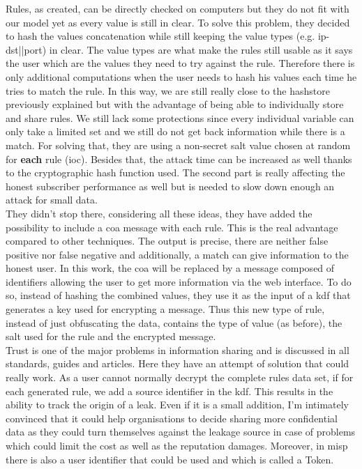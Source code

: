 \documentclass{eplmastersthesis}
\begin{document}
Rules, as created, can be directly checked on computers but they do not fit with our model yet as every value is still in clear. To solve this problem, they decided to hash the values concatenation while still keeping the value types (e.g. ip-dst||port) in clear.
The value types are what make the rules still usable as it says the user which are the values they need to try against the rule.
Therefore there is only additional computations when the user needs to hash his values each time he tries to match the rule.
In this way, we are still really close to the hashstore previously explained but with the advantage of being able to individually store and share rules. We still lack some protections since every individual variable can only take a limited set and we still do not get back information while there is a match.
For solving that, they are using a non-secret salt value chosen at random for \textbf{each} rule (\gls{ioc}). Besides that, the attack time can be increased as well thanks to the cryptographic hash function used. The second part is really affecting the honest subscriber performance as well but is needed to slow down enough an attack for small data.\\

They didn't stop there, considering all these ideas, they have added the possibility to include a \gls{coa} message with each rule. This is the real advantage compared to other techniques. The output is precise, there are neither false positive nor false negative and additionally, a match can give information to the honest user. In this work, the \gls{coa} will be replaced by a message composed of identifiers allowing the user to get more information via the web interface. To do so, instead of hashing the combined values, they use it as the input of a \gls{kdf} that generates a key used for encrypting a message.
Thus this new type of rule, instead of just obfuscating the data, contains the type of value (as before), the salt used for the rule and the encrypted message.\\

Trust is one of the major problems in information sharing and is discussed in all standards, guides and articles. Here they have an attempt of solution that could really work. As a user cannot normally decrypt the complete rules data set, if for each generated rule, we add a source identifier in the \gls{kdf}. This results in the ability to track the origin of a leak. 
Even if it is a small addition, I'm intimately convinced that it could help organisations to decide sharing more confidential data as they could turn themselves against the leakage source in case of problems which could limit the cost as well as the reputation damages. Moreover, in \gls{misp} there is also a user identifier that could be used and which is called a Token.\\
\end{document}
